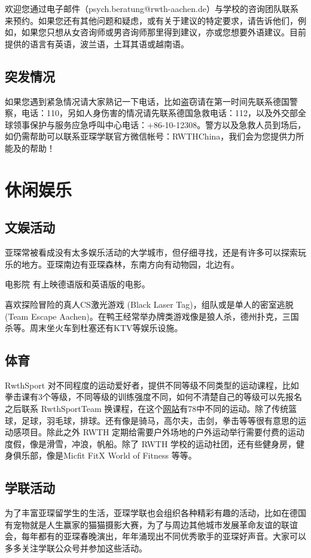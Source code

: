     欢迎您通过电子邮件（psych.beratung@rwth-aachen.de）与学校的咨询团队联系来预约。如果您还有其他问题和疑虑，或有关于建议的特定要求，请告诉他们，例如，如果您只想从女咨询师或男咨询师那里得到建议，亦或您想要外语建议。目前提供的语言有英语，波兰语，土耳其语或越南语。

  \subsection{突发情况}\label{subsec:突发情况}

    如果您遇到紧急情况请大家熟记一下电话，比如盗窃请在第一时间先联系德国警察，电话：110，另如人身伤害的情况请先联系德国急救电话：112，以及外交部全球领事保护与服务应急呼叫中心电话：+86-10-12308。警方以及急救人员到场后，如仍需帮助可以联系亚琛学联官方微信帐号：RWTHChina，我们会为您提供力所能及的帮助！

\section{休闲娱乐}\label{sec:休闲娱乐}

  \subsection{文娱活动}\label{subsec:文娱活动}

    亚琛常被看成没有太多娱乐活动的大学城市，但仔细寻找，还是有许多可以探索玩乐的地方。亚琛南边有亚琛森林，东南方向有动物园，北边有。

    电影院  有上映德语版和英语版的电影。

    喜欢探险冒险的真人CS激光游戏 (Black Laser Tag)，组队或是单人的密室逃脱 (Team Escape Aachen)。在鸭王经常举办牌类游戏像是狼人杀，德州扑克，三国杀等。周末坐火车到杜塞还有KTV等娱乐设施。

  \subsection{体育}\label{subsec:体育}

    RwthSport 对不同程度的运动爱好者，提供不同等级不同类型的运动课程，比如拳击课有3个等级，不同等级的训练强度不同，如何不清楚自己的等级可以先报名之后联系 RwthSportTeam 换课程，在这个\href{https://hochschulsport.rwth-aachen.de/cms/HSZ/Sport/Erweitertes-Uebergangsprogramm/~hpoua/Sportartensuche/}{网站}有78中不同的运动。除了传统篮球，足球，羽毛球，排球。还有像是骑马，高尔夫，击剑，拳击等等很有意思的运动感项目。除此之外 RWTH 定期给需要户外场地的户外运动举行需要付费的运动度假，像是滑雪，冲浪，帆船。除了 RWTH 学校的运动社团，还有些健身房，健身俱乐部，像是Micfit FitX World of Fitness 等等。

  \subsection{学联活动}\label{subsec:学联活动}

    为了丰富亚琛留学生的生活，亚琛学联也会组织各种精彩有趣的活动，比如在德国有宠物就是人生赢家的猫猫摄影大赛，为了与周边其他城市发展革命友谊的联谊会，每年都有的亚琛春晚演出，年年涌现出不同优秀歌手的亚琛好声音。大家可以多多关注学联公众号并参加这些活动。
